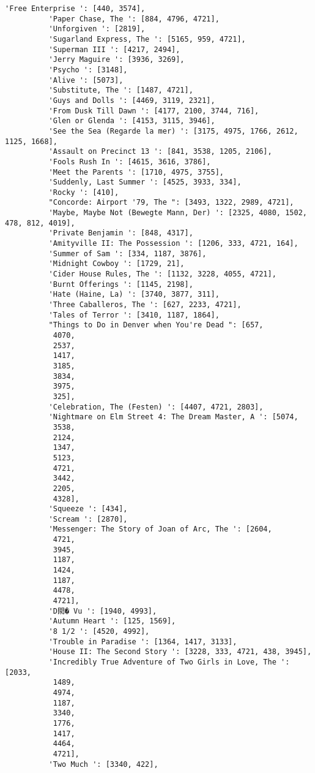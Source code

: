 \documentclass[11pt]{article}
\begin{document}
\begin{Verbatim}[commandchars=\\\{\}]
          'Free Enterprise ': [440, 3574],
          'Paper Chase, The ': [884, 4796, 4721],
          'Unforgiven ': [2819],
          'Sugarland Express, The ': [5165, 959, 4721],
          'Superman III ': [4217, 2494],
          'Jerry Maguire ': [3936, 3269],
          'Psycho ': [3148],
          'Alive ': [5073],
          'Substitute, The ': [1487, 4721],
          'Guys and Dolls ': [4469, 3119, 2321],
          'From Dusk Till Dawn ': [4177, 2100, 3744, 716],
          'Glen or Glenda ': [4153, 3115, 3946],
          'See the Sea (Regarde la mer) ': [3175, 4975, 1766, 2612, 1125, 1668],
          'Assault on Precinct 13 ': [841, 3538, 1205, 2106],
          'Fools Rush In ': [4615, 3616, 3786],
          'Meet the Parents ': [1710, 4975, 3755],
          'Suddenly, Last Summer ': [4525, 3933, 334],
          'Rocky ': [410],
          "Concorde: Airport '79, The ": [3493, 1322, 2989, 4721],
          'Maybe, Maybe Not (Bewegte Mann, Der) ': [2325, 4080, 1502, 478, 812, 4019],
          'Private Benjamin ': [848, 4317],
          'Amityville II: The Possession ': [1206, 333, 4721, 164],
          'Summer of Sam ': [334, 1187, 3876],
          'Midnight Cowboy ': [1729, 21],
          'Cider House Rules, The ': [1132, 3228, 4055, 4721],
          'Burnt Offerings ': [1145, 2198],
          'Hate (Haine, La) ': [3740, 3877, 311],
          'Three Caballeros, The ': [627, 2233, 4721],
          'Tales of Terror ': [3410, 1187, 1864],
          "Things to Do in Denver when You're Dead ": [657,
           4070,
           2537,
           1417,
           3185,
           3834,
           3975,
           325],
          'Celebration, The (Festen) ': [4407, 4721, 2803],
          'Nightmare on Elm Street 4: The Dream Master, A ': [5074,
           3538,
           2124,
           1347,
           5123,
           4721,
           3442,
           2205,
           4328],
          'Squeeze ': [434],
          'Scream ': [2870],
          'Messenger: The Story of Joan of Arc, The ': [2604,
           4721,
           3945,
           1187,
           1424,
           1187,
           4478,
           4721],
          'D閖� Vu ': [1940, 4993],
          'Autumn Heart ': [125, 1569],
          '8 1/2 ': [4520, 4992],
          'Trouble in Paradise ': [1364, 1417, 3133],
          'House II: The Second Story ': [3228, 333, 4721, 438, 3945],
          'Incredibly True Adventure of Two Girls in Love, The ': [2033,
           1489,
           4974,
           1187,
           3340,
           1776,
           1417,
           4464,
           4721],
          'Two Much ': [3340, 422],

\end{Verbatim}
\end{document}
